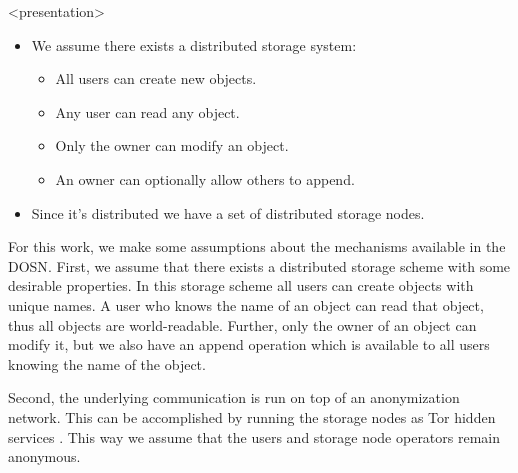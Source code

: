 \begin{frame}<presentation>
  \begin{itemize}

    \item We assume there exists a distributed storage system:
      \begin{itemize}
        \item All users can create new objects.
        \item Any user can read any object.
        \item Only the owner can modify an object.
        \item An owner can optionally allow others to append.
      \end{itemize}

    \item Since it's distributed we have a set of distributed storage nodes.

  \end{itemize}
\end{frame}
For this work, we make some assumptions about the mechanisms available in the 
\ac{DOSN}.
First, we assume that there exists a distributed storage scheme with some 
desirable properties.
In this storage scheme all users can create objects with unique names.
A user who knows the name of an object can read that object, thus all objects 
are world-readable.
Further, only the owner of an object can modify it, but we also have an append 
operation which is available to all users knowing the name of the object.

%
%
%
Second, the underlying communication is run on top of an anonymization 
network.
This can be accomplished by running the storage nodes as Tor hidden services 
\cite{tor}.
This way we assume that the users and storage node operators remain anonymous.

